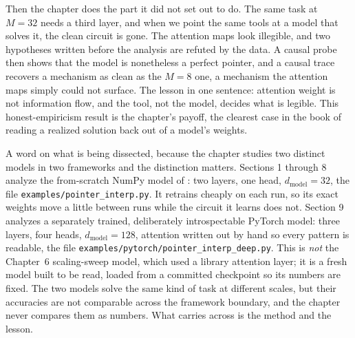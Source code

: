 Then the chapter does the part it did not set out to do. The same task at
$M = 32$ needs a third layer, and when we point the same tools at a model
that solves it, the clean circuit is gone. The attention maps look
illegible, and two hypotheses written before the analysis are refuted by the
data. A causal probe then shows that the model is nonetheless a perfect
pointer, and a causal trace recovers a mechanism as clean as the $M = 8$
one, a mechanism the attention maps simply could not surface. The lesson in
one sentence: attention weight is not information flow, and the tool, not
the model, decides what is legible. This honest-empiricism result is the
chapter's payoff, the clearest case in the book of reading a realized solution
back out of a model's weights.

A word on what is being dissected, because the chapter studies two distinct
models in two frameworks and the distinction matters. Sections 1 through 8
analyze the from-scratch NumPy model of : two layers,
one head, $d_{\text{model}} = 32$, the file
\texttt{examples/pointer\_interp.py}. It retrains cheaply on each run, so its
exact weights move a little between runs while the circuit it learns does
not. Section 9 analyzes a separately trained, deliberately introspectable
PyTorch model: three layers, four heads, $d_{\text{model}} = 128$, attention
written out by hand so every pattern is readable, the file
\texttt{examples/pytorch/pointer\_interp\_deep.py}. This is \emph{not} the
Chapter~6 scaling-sweep model, which used a library attention layer; it is a
fresh model built to be read, loaded from a committed checkpoint so its
numbers are fixed. The two models solve the same kind of task at different
scales, but their accuracies are not comparable across the framework
boundary, and the chapter never compares them as numbers. What carries
across is the method and the lesson.







